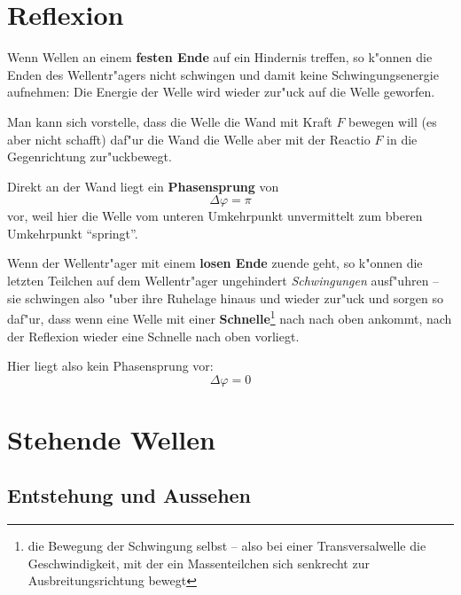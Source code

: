 \section{Reflexion}
\label{kap_reflexion}

Wenn Wellen an einem \textbf{festen Ende} auf ein
Hindernis treffen, so k"onnen die Enden des Wellentr"agers nicht
schwingen und damit keine Schwingungsenergie aufnehmen: Die Energie
der Welle wird wieder zur"uck auf die Welle geworfen.

Man kann sich vorstelle, dass die Welle die Wand mit Kraft $F$ bewegen
will (es aber nicht schafft) daf"ur die Wand die Welle aber mit der
Reactio $F$ in die Gegenrichtung zur"uckbewegt. 

Direkt an der Wand liegt ein \textbf{Phasensprung} von 
$$
\Delta \varphi = \pi
$$
vor, weil hier die Welle vom unteren Umkehrpunkt unvermittelt zum
bberen Umkehrpunkt "`springt"'.


\bigskip

Wenn der Wellentr"ager mit einem \textbf{losen Ende} zuende geht, so
k"onnen die letzten Teilchen auf dem Wellentr"ager ungehindert
\emph{Schwingungen} ausf"uhren -- sie schwingen also "uber ihre Ruhelage
hinaus und wieder zur"uck und sorgen so daf"ur, dass wenn eine Welle mit
einer \textbf{Schnelle}\footnote{die Bewegung der Schwingung
selbst --
also bei einer Transversalwelle die Geschwindigkeit, mit der ein
Massenteilchen sich senkrecht zur Ausbreitungsrichtung bewegt} nach
nach oben ankommt, nach der Reflexion wieder eine Schnelle nach oben
vorliegt. 

Hier liegt also kein Phasensprung vor:
\begin{equation}
   \label{eq:156}
   \Delta \varphi = 0
\end{equation}









\section{Stehende Wellen}
\label{kap_stehende-wellen}

\subsection{Entstehung und Aussehen}
\label{kap_entstehung-und-aussehen}



